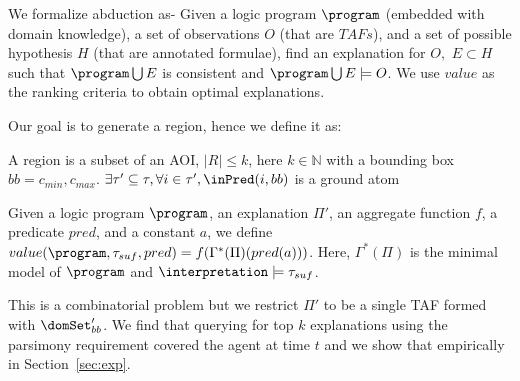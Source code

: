 We formalize abduction as- Given a logic program $\program$ (embedded with domain knowledge), a set of observations $O$ (that are $TAFs$), and a set of possible hypothesis $H$ (that are annotated formulae), find an explanation for $O,$
$E \subset H$ such that $\program \bigcup E$ is consistent and $\program \bigcup E \models O$. We use $value$ as the ranking criteria to obtain optimal explanations.

Our goal is to generate a region, hence we define it as:
\begin{definition}[Region]
    A region is a subset of an AOI, $|R| \leq k$, here $k \in \mathbb{N}$ with a bounding box $bb={c_{min}, c_{max}}$. $\exists \tau' \subseteq \tau, \forall i \in \tau', \inPred(i,bb)$ is a ground atom
\end{definition}

\begin{definition}
Given a logic program $\program$, an explanation $\Pi'$, an aggregate function $f$, a predicate $pred$, and a constant $a$, we define $value(\program, \tau_{suf}, pred) = f(\Gamma^*(\Pi)(pred(a)))$. Here, $\Gamma^*(\Pi)$ is the minimal model of $\program$ and $\interpretation \models \tau_{suf}$.
\end{definition}

This is a combinatorial problem but we restrict $\Pi'$ to be a single TAF formed with $\domSet_{bb}'$. We find that querying for top $k$ explanations using the parsimony requirement covered the agent at time $t$ and we show that empirically in Section~\ref{sec:exp}.

